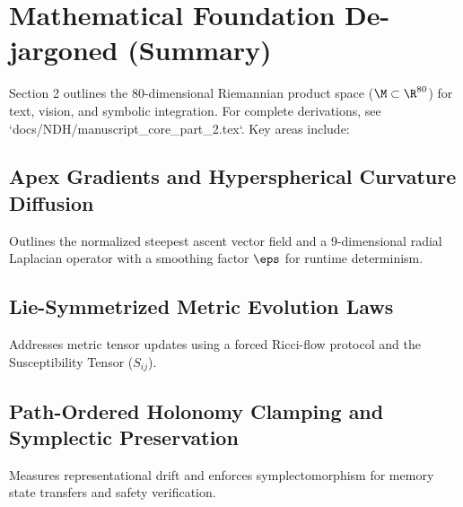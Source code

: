 
\section{Mathematical Foundation De-jargoned (Summary)}

Section 2 outlines the 80-dimensional Riemannian product space ($\M \subset \R^{80}$) for text, vision, and symbolic integration. For complete derivations, see `docs/NDH/manuscript_core_part_2.tex`. Key areas include:

\subsection{Apex Gradients and Hyperspherical Curvature Diffusion}
Outlines the normalized steepest ascent vector field and a 9-dimensional radial Laplacian operator with a smoothing factor $\eps$ for runtime determinism.

\subsection{Lie-Symmetrized Metric Evolution Laws}
Addresses metric tensor updates using a forced Ricci-flow protocol and the Susceptibility Tensor ($S_{ij}$).

\subsection{Path-Ordered Holonomy Clamping and Symplectic Preservation}
Measures representational drift and enforces symplectomorphism for memory state transfers and safety verification.
